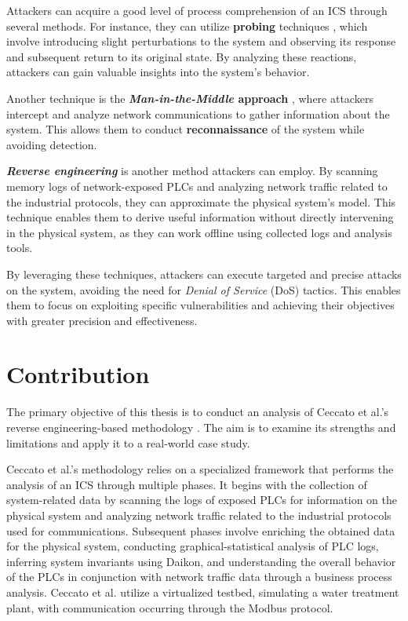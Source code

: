 Attackers can acquire a good level of process comprehension of an ICS %
through several methods.  For instance, they can utilize \textbf{probing} techniques \cite{winnicki_et_al}, which involve introducing slight perturbations to the system and observing its response and subsequent return to its original state. By analyzing these reactions, attackers can gain valuable insights into the system's behavior.

Another technique is the \textbf{\textit{Man-in-the-Middle} approach} \cite{green_et_al}, where attackers intercept and analyze network communications to gather information about the system. This allows them to conduct \textbf{reconnaissance} of the system while avoiding detection.

\textbf{\textit{Reverse engineering}} \cite{ceccato}\cite{keliris_maniatakos} is another method attackers can employ. By scanning memory logs of network-exposed PLCs and analyzing network traffic related to the industrial protocols, they can approximate the physical system's model. This technique enables them to derive useful information without directly intervening in the physical system, as they can work offline using collected logs and analysis tools.

\bigskip
By leveraging these techniques, attackers can execute targeted and precise attacks on the system, avoiding the need for \textit{Denial of Service} (DoS) tactics. This enables them to focus on exploiting specific vulnerabilities and achieving their objectives with greater precision and effectiveness.

\section*{Contribution}
\label{sec:1_contribution}

The primary objective of this thesis is to conduct an analysis of Ceccato et al.'s reverse engineering-based methodology \cite{ceccato}. The aim is to examine its strengths and limitations and apply it to a real-world case study.

\bigskip
Ceccato et al.'s methodology relies on a specialized framework that performs the analysis of an ICS through multiple phases. It begins with the collection of system-related data by scanning the logs of exposed PLCs for information on the physical system and analyzing network traffic related to the industrial protocols used for communications. Subsequent phases involve enriching the obtained data for the physical system, conducting graphical-statistical analysis of PLC logs, inferring system invariants using Daikon, and understanding the overall behavior of the PLCs in conjunction with network traffic data through a business process analysis. Ceccato et al. utilize a virtualized testbed, simulating a water treatment plant, with communication occurring through the Modbus protocol.

